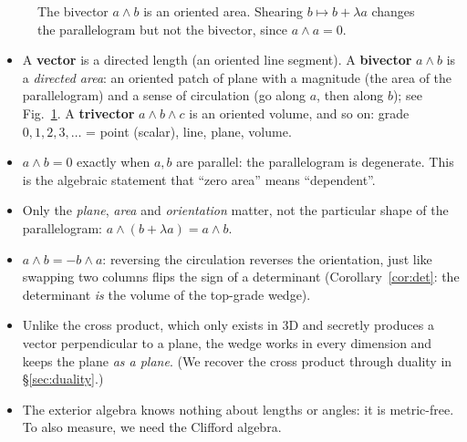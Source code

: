 \documentclass[11pt,a4paper]{article}
\numberwithin{equation}{section}
\theoremstyle{definition}
\theoremstyle{plain}
\begin{document}
\begin{figure}[ht]
\centering
{}
\caption{The bivector $a\wedge b$ is an oriented area. Shearing $b\mapsto b+\lambda a$ changes the parallelogram but not the bivector, since $a\wedge a=0$.}
\label{fig:wedge}
\end{figure}

\begin{intuition}
\begin{itemize}
  \item A \textbf{vector} is a directed length (an oriented line segment). A \textbf{bivector} $a\wedge b$ is a \emph{directed area}: an
  oriented patch of plane with a magnitude (the area of the parallelogram) and a sense of circulation (go along $a$, then along $b$);
  see Fig.~\ref{fig:wedge}. A \textbf{trivector} $a\wedge b\wedge c$ is an oriented volume, and so on: grade $0,1,2,3,\dots$ = point (scalar), line, plane, volume.
  \item $a\wedge b=0$ exactly when $a,b$ are parallel: the parallelogram is degenerate. This is the algebraic statement that ``zero area'' means ``dependent''.
  \item Only the \emph{plane}, \emph{area} and \emph{orientation} matter, not the particular shape of the parallelogram: $a\wedge(b+\lambda a)=a\wedge b$.
  \item $a\wedge b=-b\wedge a$: reversing the circulation reverses the orientation, just like swapping two columns flips the sign of a determinant (Corollary~\ref{cor:det}: the determinant \emph{is} the volume of the top-grade wedge).
  \item Unlike the cross product, which only exists in $3$D and secretly produces a vector perpendicular to a plane, the wedge works in every dimension and keeps the plane \emph{as a plane}. (We recover the cross product through duality in \S\ref{sec:duality}.)
  \item The exterior algebra knows nothing about lengths or angles: it is metric-free. To also measure, we need the Clifford algebra.
\end{itemize}
\end{intuition}
\end{document}
